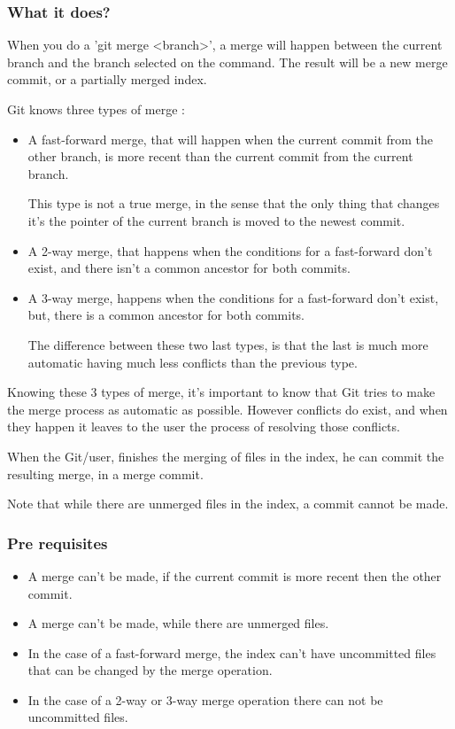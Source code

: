\subsubsection{What it does?}

When you do a 'git merge <branch>', a merge will happen between the current
branch and the branch selected on the command. The result will be a new merge 
commit, or a partially merged index. \par

Git knows three types of merge : 
\begin{itemize}
\item A fast-forward merge, that will happen when 
the current commit from the other
branch, is more recent than the current commit from the current branch. \par
This type is not a true merge, in the sense that the only thing that
changes it's the pointer of the current branch
is moved to the newest commit.

\item A 2-way merge, that happens when the conditions for a fast-forward
don't exist, and there isn't a common ancestor for both commits.

\item A 3-way merge, happens when the conditions for a fast-forward
don't exist, but, there is a common ancestor for both commits. \par
The difference between these two last types, is that the last is much 
more automatic having much less conflicts than the previous type.
\end{itemize}
Knowing these 3 types of merge, it's important to know that Git tries to make
the merge process as automatic as possible. However conflicts do exist, and when
they happen it leaves to the user the process of resolving those conflicts. \par
When the Git/user, finishes the merging of files in the index, he
can commit the resulting merge, in a merge commit. \par
Note that while there are unmerged files in the index, a commit cannot be
made. \par 

\subsubsection{Pre requisites}

\begin{itemize}
\item A merge can't be made, if the current commit is more recent then the
other commit.
\item A merge can't be made, while there are unmerged files.
\item In the case of a fast-forward merge, the index can't have uncommitted
files that can be changed by the merge operation.
\item In the case of a 2-way or 3-way merge operation there can not be
uncommitted files. 
\end{itemize}

